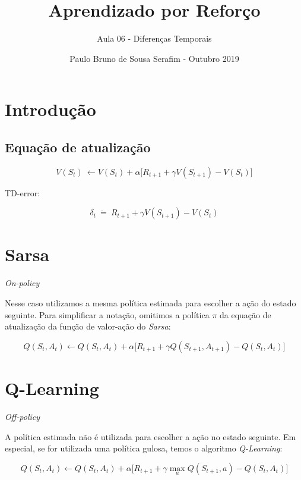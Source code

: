 \documentclass{article}
\title{Aprendizado por Reforço}
\author{Aula 06 - Diferenças Temporais}
\date{Paulo Bruno de Sousa Serafim - Outubro 2019}
\begin{document}
\maketitle

\section{Introdução}

    \subsection{Equação de atualização}
    
        \begin{equation}
            V(S_t) \ \leftarrow V(S_t) + \alpha \Big[ R_{t+1} + \gamma V(S_{t+1}) - V(S_t) \Big]
        \end{equation}
    
        TD-error:
        
        \begin{equation}
            \delta_t \ \dot{=} \ R_{t+1} + \gamma V(S_{t+1}) - V(S_t)
        \end{equation}
    
\section{Sarsa}

    \textit{On-policy}

    Nesse caso utilizamos a mesma política estimada para escolher a ação do estado seguinte. Para simplificar a notação, omitimos a política $\pi$ da equação de atualização da função de valor-ação do \textit{Sarsa}:

    \begin{equation}
        Q(S_t, A_t) \leftarrow Q(S_t, A_t) + \alpha \Big[ R_{t+1} + \gamma Q(S_{t+1}, A_{t+1}) - Q(S_t, A_t) \Big]
    \end{equation}
    
\section{Q-Learning}

    \textit{Off-policy}
    
    A política estimada não é utilizada para escolher a ação no estado seguinte. Em especial, se for utilizada uma política gulosa, temos o algoritmo \textit{Q-Learning}:

    \begin{equation}
        Q(S_t, A_t) \leftarrow Q(S_t, A_t) + \alpha \Big[ R_{t+1} + \gamma \max_{a} Q(S_{t+1}, a) - Q(S_t, A_t) \Big]
    \end{equation}
\end{document}
